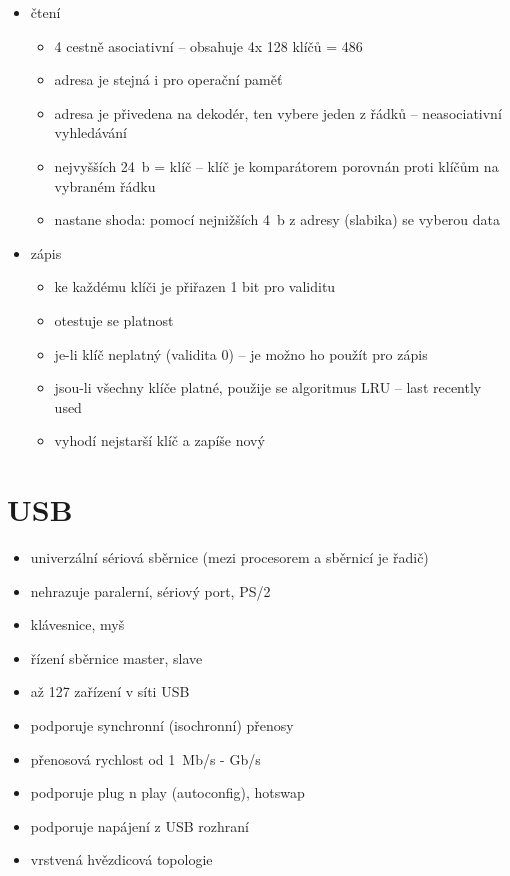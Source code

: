 \documentclass[a4paper,12pt]{article}
\providecommand{\tightlist}{%
\setlength{\itemsep}{0pt}\setlength{\parskip}{0pt}}
\begin{document}
\begin{itemize}
  \tightlist
  \item čtení
  \begin{itemize}
    \tightlist
    \item 4 cestně asociativní -- obsahuje 4x 128 klíčů = 486
    \item adresa je stejná i pro operační paměť
    \item adresa je přivedena na dekodér, ten vybere jeden z řádků --
    neasociativní vyhledávání
    \item nejvyšších 24~b = klíč -- klíč je komparátorem porovnán proti klíčům
    na vybraném řádku
    \item nastane shoda: pomocí nejnižších 4~b z adresy (slabika) se vyberou data
  \end{itemize}
  \item zápis
  \begin{itemize}
    \tightlist
    \item ke každému klíči je přiřazen 1 bit pro validitu
    \item otestuje se platnost
    \item je-li klíč neplatný (validita 0) -- je možno ho použít pro zápis
    \item jsou-li všechny klíče platné, použije se algoritmus LRU -- last
    recently used
    \item vyhodí nejstarší klíč a zapíše nový
  \end{itemize}
\end{itemize}

\section{USB}

\begin{itemize}
  \tightlist
  \item univerzální sériová sběrnice (mezi procesorem a sběrnicí je řadič)
  \item nehrazuje paralerní, sériový port, PS/2
  \item klávesnice, myš
  \item řízení sběrnice master, slave
  \item až 127 zařízení v síti USB
  \item podporuje synchronní (isochronní) přenosy
  \item přenosová rychlost od 1~Mb/s - Gb/s
  \item podporuje plug n play (autoconfig), hotswap
  \item podporuje napájení z USB rozhraní
  \item vrstvená hvězdicová topologie
\end{itemize}
\end{document}
